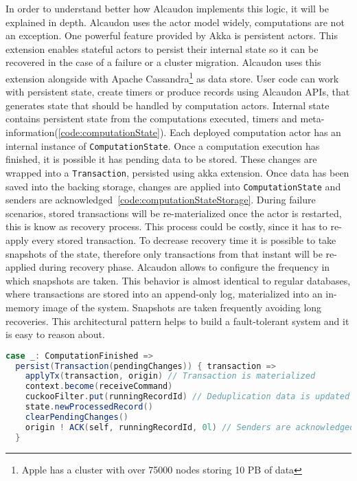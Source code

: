 In order to understand better how Alcaudon implements this logic, it will be
explained in depth. Alcaudon uses the actor model widely, computations are not
an exception. One powerful feature provided by Akka is persistent actors. This
extension enables stateful actors to persist their internal state so it can be
recovered in the case of a failure or a cluster migration. Alcaudon uses this
extension alongside with Apache Cassandra\footnote{Apple has a cluster with over
  75000 nodes storing 10 PB of data} as data store. User code can work with
persistent state, create timers or produce records using Alcaudon \acs{API}s,
that generates state that should be handled by computation actors. Internal
state contains persistent state from the computations executed, timers and
meta-information(\ref{code:computationState}). Each
deployed computation actor has an internal instance of
\lstinline[columns=fixed]{ComputationState}. Once a computation execution has
finished, it is possible it has pending data to be stored. These changes are wrapped
into a \lstinline[columns=fixed]{Transaction}, persisted using akka extension.
Once data has been saved into the backing storage, changes are applied into
\lstinline[columns=fixed]{ComputationState} and senders are
acknowledged~\ref{code:computationStateStorage}. During failure scenarios, stored
transactions will be re-materialized once the actor is restarted, this is
know as recovery process. This process could be costly, since it has to re-apply
every stored transaction. To decrease recovery time it is possible to take
snapshots of the state, therefore only transactions from that instant will be
re-applied during recovery phase. Alcaudon allows to configure the frequency in
which snapshots are taken. This behavior is almost identical to regular
databases, where transactions are stored into an append-only log, materialized into an
in-memory image of the system. Snapshots are taken frequently avoiding long
recoveries. This architectural pattern helps to build a fault-tolerant system
and it is easy to reason about.

\begin{lstlisting}[language=scala, frame=trBL, label=code:computationStateStorage, float=ht, caption = {Computation state persistence}]
case _: ComputationFinished =>
  persist(Transaction(pendingChanges)) { transaction =>
    applyTx(transaction, origin) // Transaction is materialized
    context.become(receiveCommand)
    cuckooFilter.put(runningRecordId) // Deduplication data is updated
    state.newProcessedRecord()
    clearPendingChanges()
    origin ! ACK(self, runningRecordId, 0l) // Senders are acknowledged
  }
\end{lstlisting}

